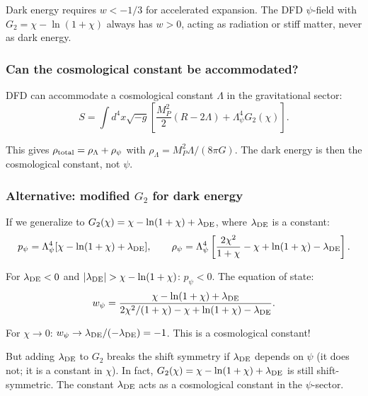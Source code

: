 \documentclass[11pt,a4paper]{article}
\begin{document}
Dark energy requires $w < -1/3$ for accelerated expansion. The DFD $\psi$-field with $G_2 = \chi - \ln(1+\chi)$ always has $w > 0$, acting as radiation or stiff matter, never as dark energy.

\subsubsection{Can the cosmological constant be accommodated?}

DFD can accommodate a cosmological constant $\Lambda$ in the gravitational sector:
\begin{equation}
S = \int d^4x\sqrt{-g}\left[\frac{M_P^2}{2}(R - 2\Lambda) + \Lambda_\psi^4 G_2(\chi)\right].
\end{equation}

This gives $\rho_{\rm total} = \rho_\Lambda + \rho_\psi$ with $\rho_\Lambda = M_P^2\Lambda/(8\pi G)$. The dark energy is then the cosmological constant, not $\psi$.

\subsubsection{Alternative: modified $G_2$ for dark energy}

If we generalize to $G_2(\chi) = \chi - \ln(1+\chi) + \lambda_{\rm DE}$, where $\lambda_{\rm DE}$ is a constant:
\begin{equation}
p_\psi = \Lambda_\psi^4[\chi - \ln(1+\chi) + \lambda_{\rm DE}], \qquad \rho_\psi = \Lambda_\psi^4\left[\frac{2\chi^2}{1+\chi} - \chi + \ln(1+\chi) - \lambda_{\rm DE}\right].
\end{equation}

For $\lambda_{\rm DE} < 0$ and $|\lambda_{\rm DE}| > \chi - \ln(1+\chi)$: $p_\psi < 0$. The equation of state:
\begin{equation}
w_\psi = \frac{\chi - \ln(1+\chi) + \lambda_{\rm DE}}{2\chi^2/(1+\chi) - \chi + \ln(1+\chi) - \lambda_{\rm DE}}.
\end{equation}

For $\chi \to 0$: $w_\psi \to \lambda_{\rm DE}/(-\lambda_{\rm DE}) = -1$. This is a cosmological constant!

But adding $\lambda_{\rm DE}$ to $G_2$ breaks the shift symmetry if $\lambda_{\rm DE}$ depends on $\psi$ (it does not; it is a constant in $\chi$). In fact, $G_2(\chi) = \chi - \ln(1+\chi) + \lambda_{\rm DE}$ is still shift-symmetric. The constant $\lambda_{\rm DE}$ acts as a cosmological constant in the $\psi$-sector.
\end{document}
